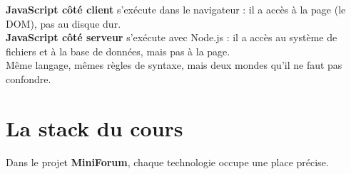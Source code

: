 \documentclass[a4paper,11pt]{article}
\begin{document}
\begin{tcolorbox}[attention, title={Important --- Le même langage, deux environnements}]
\textbf{JavaScript côté client} s'exécute dans le navigateur : il a accès à la page (le DOM), pas au disque dur.\\[3pt]
\textbf{JavaScript côté serveur} s'exécute avec Node.js : il a accès au système de fichiers et à la base de données, mais pas à la page.\\[3pt]
Même langage, mêmes règles de syntaxe, mais deux mondes qu'il ne faut pas confondre.
\end{tcolorbox}

\section{La stack du cours}

Dans le projet \textbf{MiniForum}, chaque technologie occupe une place précise.
\end{document}

